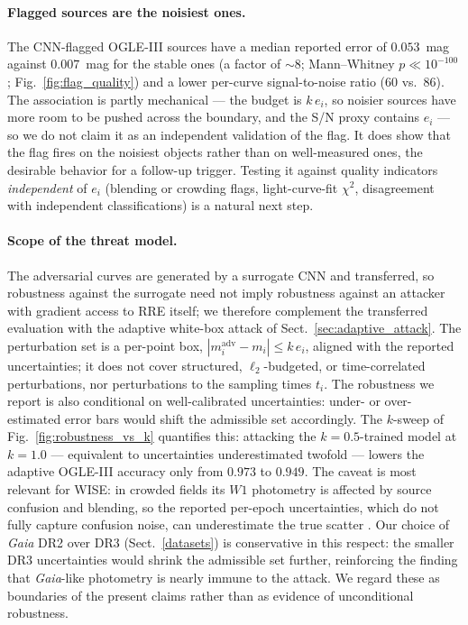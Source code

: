 \documentclass{aa}
\begin{document}
\paragraph{Flagged sources are the noisiest ones.}
The CNN-flagged OGLE-III sources have a median reported error of
$0.053$~mag against $0.007$~mag for the stable ones (a factor of ${\sim}8$;
Mann--Whitney $p \ll 10^{-100}$; Fig.~\ref{fig:flag_quality}) and a lower
per-curve signal-to-noise ratio ($60$ vs.\ $86$). The association is partly
mechanical --- the budget is $k\,e_i$, so noisier sources have more room
to be pushed across the boundary, and the S/N proxy contains $e_i$ --- so
we do not claim it as an independent validation of the flag. It does show
that the flag fires on the noisiest objects rather than on well-measured
ones, the desirable behavior for a follow-up trigger. Testing it against
quality indicators \emph{independent} of $e_i$ (blending or crowding flags,
light-curve-fit $\chi^2$, disagreement with independent classifications)
is a natural next step.

\paragraph{Scope of the threat model.}
The adversarial curves are generated by a surrogate CNN and transferred,
so robustness against the surrogate need not imply robustness against an
attacker with gradient access to RRE itself; we therefore complement the
transferred evaluation with the adaptive white-box attack of
Sect.~\ref{sec:adaptive_attack}. The perturbation set is a per-point box,
$|m_i^{\mathrm{adv}}-m_i|\le k\,e_i$, aligned with the reported
uncertainties; it does not cover structured, $\ell_2$-budgeted, or
time-correlated perturbations, nor perturbations to the sampling times
$t_i$. The robustness we report is also conditional on well-calibrated
uncertainties: under- or over-estimated error bars would shift the
admissible set accordingly. The $k$-sweep of Fig.~\ref{fig:robustness_vs_k}
quantifies this: attacking the $k=0.5$-trained model at $k=1.0$ ---
equivalent to uncertainties underestimated twofold --- lowers the adaptive
OGLE-III accuracy only from $0.973$ to $0.949$. The caveat is most relevant
for WISE: in crowded fields its $W1$ photometry is affected by source
confusion and blending, so the reported per-epoch uncertainties, which do
not fully capture confusion noise, can underestimate the true scatter \citep{cutri2012explanatory,cutri2013explanatory}. Our choice of
\textit{Gaia} DR2 over DR3 (Sect.~\ref{datasets}) is conservative in this
respect: the smaller DR3 uncertainties would shrink the admissible set
further, reinforcing the finding that \textit{Gaia}-like photometry is
nearly immune to the attack. We regard these as boundaries of the present
claims rather than as evidence of unconditional robustness.
\end{document}
